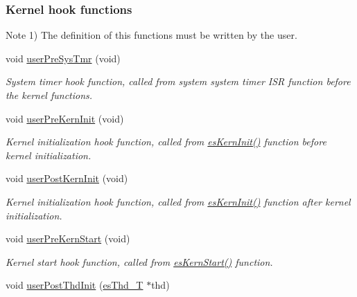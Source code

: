 \subsubsection*{Kernel hook functions}
\label{_amgrp1ac47bb3ac7873775afb0f49bf86f38e}%
\begin{DoxyNote}{Note}
1) The definition of this functions must be written by the user. 
\end{DoxyNote}
\begin{DoxyCompactItemize}
\item 
void \hyperlink{group__kern__intf_ga9a0d562969acef0121136b11be7b4728}{user\-Pre\-Sys\-Tmr} (void)
\begin{DoxyCompactList}\small\item\em System timer hook function, called from system system timer I\-S\-R function before the kernel functions. \end{DoxyCompactList}\item 
void \hyperlink{group__kern__intf_gaac77966856c9a299cda4794cbcc87edf}{user\-Pre\-Kern\-Init} (void)
\begin{DoxyCompactList}\small\item\em Kernel initialization hook function, called from \hyperlink{group__kern__intf_ga9e9ff699d62d6035cd51121bb3140704}{es\-Kern\-Init()} function before kernel initialization. \end{DoxyCompactList}\item 
void \hyperlink{group__kern__intf_ga3579ac6964a314ad03d13da0507f57e8}{user\-Post\-Kern\-Init} (void)
\begin{DoxyCompactList}\small\item\em Kernel initialization hook function, called from \hyperlink{group__kern__intf_ga9e9ff699d62d6035cd51121bb3140704}{es\-Kern\-Init()} function after kernel initialization. \end{DoxyCompactList}\item 
void \hyperlink{group__kern__intf_gaac505ab4c72e0fb346ca441d6def327d}{user\-Pre\-Kern\-Start} (void)
\begin{DoxyCompactList}\small\item\em Kernel start hook function, called from \hyperlink{group__kern__intf_ga0e7a0a6b9c02df58de0f98de0229a09d}{es\-Kern\-Start()} function. \end{DoxyCompactList}\item 
void \hyperlink{group__kern__intf_ga64ca864d0ff2aaa532208d7c2b88bdb3}{user\-Post\-Thd\-Init} (\hyperlink{group__kern__intf_ga62e3a3ca0a4597a19c43cb8868810d82}{es\-Thd\-\_\-\-T} $\ast$thd)

\end{DoxyCompactItemize}
